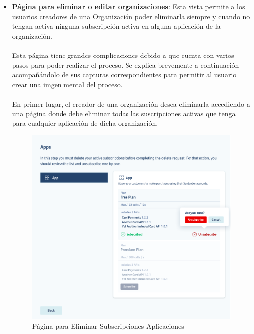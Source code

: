 \documentclass[a4paper,12pt]{article}
\begin{document}
\begin{itemize}
\begin{itemize}
        \item \textbf{Página para eliminar o editar organizaciones}: Esta vista permite a los usuarios creadores de una Organización poder eliminarla siempre y cuando no tengan activa ninguna subscripción activa en alguna aplicación de la organización.\\
        \\
        Esta página tiene grandes complicaciones debido a que cuenta con varios pasos para poder realizar el proceso. Se explica brevemente a continuación acompañándolo de sus capturas correspondientes para permitir al usuario crear una imgen mental del proceso.\\
        \\
        En primer lugar, el creador de una organización desea eliminarla accediendo a una página donde debe eliminar todas las suscripciones activas que tenga para cualquier aplicación de dicha organización.
        \begin{figure}[H]
            \centering
            \includegraphics[scale=0.7]{appsSub.PNG}
            \caption{Página para Eliminar Subscripciones Aplicaciones}
            \label{fig:my_label}
        \end{figure}
        

\end{itemize}
\end{itemize}
\end{document}
